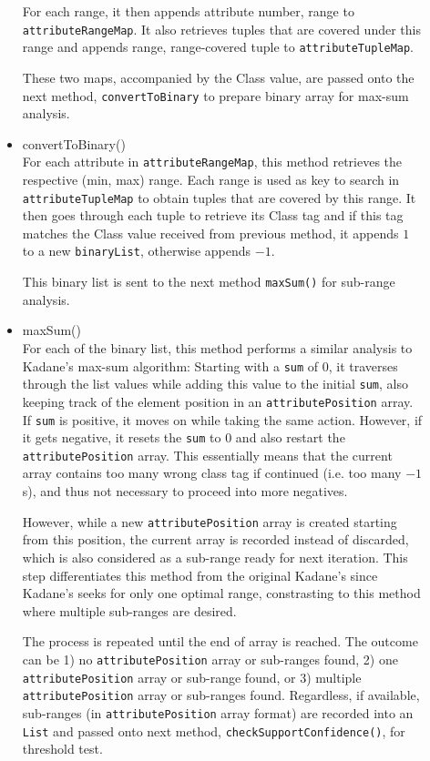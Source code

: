 \begin{description}
\begin{itemize}
	For each range, it then appends {attribute number, range} to \texttt{attributeRangeMap}. It also retrieves tuples that are covered under this range and appends {range, range-covered tuple} to \texttt{attributeTupleMap}. 
	
	These two maps, accompanied by the Class value, are passed onto the next method, \texttt{convertToBinary} to prepare binary array for max-sum analysis.
	
	\item{convertToBinary()} \\
	For each attribute in \texttt{attributeRangeMap}, this method retrieves the respective (min, max) range. Each range is used as key to search in \texttt{attributeTupleMap} to obtain tuples that are covered by this range. It then goes through each tuple to retrieve its Class tag and if this tag matches the Class value received from previous method, it appends $1$ to a new \texttt{binaryList}, otherwise appends $-1$. 
	
	This binary list is sent to the next method \texttt{maxSum()} for sub-range analysis.
	
	\item{maxSum()} \\
	For each of the binary list, this method performs a similar analysis to Kadane's max-sum algorithm: Starting with a \texttt{sum} of $0$, it traverses through the list values while adding this value to the initial \texttt{sum}, also keeping track of the element position in an \texttt{attributePosition} array. If \texttt{sum} is positive, it moves on while taking the same action. However, if it gets negative, it resets the \texttt{sum} to $0$ and also restart the \texttt{attributePosition} array. This essentially means that the current array contains too many wrong class tag if continued (i.e. too many $-1$s), and thus not necessary to proceed into more negatives. 
	
	However, while a new \texttt{attributePosition} array is created starting from this position, the current array is recorded instead of discarded, which is also considered as a sub-range ready for next iteration. This step differentiates this method from the original Kadane's since Kadane's seeks for only one optimal range, constrasting to this method where multiple sub-ranges are desired.
	
	The process is repeated until the end of array is reached. The outcome can be 1) no \texttt{attributePosition} array or sub-ranges found, 2) one \texttt{attributePosition} array or sub-range found, or 3) multiple \texttt{attributePosition} array or sub-ranges found. Regardless, if available, sub-ranges (in \texttt{attributePosition} array format) are recorded into an \texttt{List} and passed onto next method, \texttt{checkSupportConfidence()}, for threshold test. 
	

\end{itemize}
\end{description}
